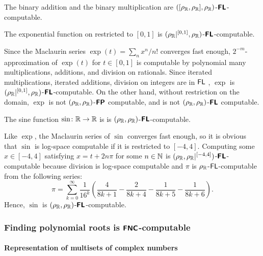 \documentclass[envcountsame,orivec,oribibl]{llncs}
\begin{document}
\begin{example}
 The binary addition and the binary multiplication are
 $([\rho _\mathbb R, \rho _\mathbb R], \rho _\mathbb R)$-$\text{\bfseries \sffamily \upshape FL}$-computable.
\end{example}

\begin{lemma}
 The exponential function on restricted to $[0,1]$
 is $(\rho _\mathbb R|^{[0,1]}, \rho _\mathbb R)$-$\text{\bfseries \sffamily \upshape FL}$-computable.
\end{lemma}
Since the Maclaurin series $\exp(t) = \sum_n x^n / n!$ converges fast enough,
$2^{-m}$-approximation of $\exp(t)$ for $t \in [0,1]$ is computable 
by polynomial many multiplications, additions, and division on rationals.
Since iterated multiplications, iterated additions, division on integers
are in $\mathsf{FL}$ \cite{chiu2001division},
$\exp$ is $(\rho _\mathbb R|^{[0,1]}, \rho _\mathbb R)$-$\text{\bfseries \sffamily \upshape FL}$-computable.
On the other hand, without restriction on the domain, $\exp$ is not 
$(\rho _\mathbb R, \rho _\mathbb R)$-$\text{\bfseries \sffamily \upshape FP}$ computable, 
and is not $(\rho _\mathbb R, \rho _\mathbb R)$-$\text{\bfseries \sffamily \upshape FL}$ computable.



\begin{lemma}
  The sine function $\sin \colon \mathbb R \to \mathbb R$ is
 is $(\rho _\mathbb R, \rho _\mathbb R)$-$\text{\bfseries \sffamily \upshape FL}$-computable.
\end{lemma}
Like $\exp$, the Maclaurin series of $\sin$ converges fast enough,
so it is obvious that $\sin$ is log-space computable if it is restricted to $[-4, 4]$.
Computing some $x \in [-4, 4]$ satisfying $x = t + 2n\pi$ for 
some $n \in \mathbb N$ is
$(\rho _\mathbb R, \rho _\mathbb R|^{[-4,4]})$-$\text{\bfseries \sffamily \upshape FL}$-computable because division is log-space computable and $\pi$ is $\rho _\mathbb R$-$\mathsf{FL}$-computable from the following series:
\begin{equation}
 \pi = \sum_{k=0}^\infty \frac{1}{16^k} 
  \left( \frac{4}{8k+1} - \frac{2}{8k+4} - \frac{1}{8k+5} - \frac{1}{8k+6} \right).
\end{equation}
Hence, $\sin$ is $(\rho _\mathbb R, \rho _\mathbb R)$-$\text{\bfseries \sffamily \upshape FL}$-computable.



\subsubsection{Finding polynomial roots is $\text{\bfseries \sffamily \upshape FNC}$-computable}

\paragraph{Representation of multisets of complex numbers}
\end{document}
